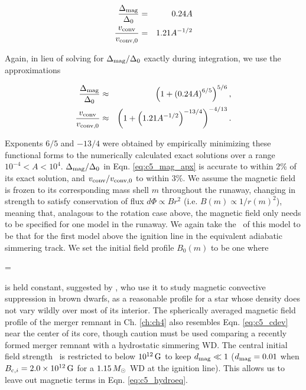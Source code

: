 
\begin{eqnarray}
\frac{\dnabmag}{\dnabconvzero} &=& 0.24A \nonumber \\
\frac{\vconv}{\vconvzero} &=& 1.21A^{-1/2}
\label{eq:c5_mag_exactsoln}
\end{eqnarray}

\noindent Again, in lieu of solving for $\dnabmag/\dnabconvzero$ exactly during integration, we use the approximations 

\begin{eqnarray}
\frac{\dnabmag}{\dnabconvzero} &\approx& \left(1 + \left(0.24A\right)^{6/5}\right)^{5/6}, \nonumber \\
\frac{\vconv}{\vconvzero} &\approx& \left(1 + \left(1.21A^{-1/2}\right)^{-13/4}\right)^{-4/13}.
\label{eq:c5_mag_apx}
\end{eqnarray}

\noindent Exponents $6/5$ and $-13/4$ were obtained by empirically minimizing these functional forms to the numerically calculated exact solutions over a range $10^{-4} < A < 10^4$.  $\dnabmag/\dnabconvzero$ in Eqn. \ref{eq:c5_mag_apx} is accurate to within $2$\% of its exact solution, and $\vconv/\vconvzero$ to within $3$\%.  We assume the magnetic field is frozen to its corresponding mass shell $m$ throughout the runaway, changing in strength to satisfy conservation of flux $d\Phi \propto B r^2$ (i.e. $B(m) \propto 1/r(m)^2$), meaning that, analagous to the rotation case above, the magnetic field only needs to be specified for one model in the runaway.  We again take the \Sc\ of this model to be that for the first model above the ignition line in the equivalent adiabatic simmering track.  We set the initial field profile $B_0(m)$ to be one where

\eqbegin
\dmag = 
\label{eq:c5_cdev}
\eqend


\noindent is held constant, suggested by \cite{macdm09}, who use it to study magnetic convective suppression in brown dwarfs, as a reasonable profile for a star whose density does not vary wildly over most of its interior.  The spherically averaged magnetic field profile of the merger remnant in Ch. \ref{ch:ch4} also resembles Eqn. \ref{eq:c5_cdev} near the center of its core, though caution must be used comparing a recently formed merger remnant with a hydrostatic simmering WD.  The central initial field strength \Binit\ is restricted to below $10^{12}\,\mathrm{G}$ to keep $\dmag \ll 1$ ($\dmag = 0.01$ when $\Binit = 2.0\times10^{12}\,\mrm{G}$ for a $1.15\,\Msun$ WD at the ignition line).  This allows us to leave out magnetic terms in Eqn. \ref{eq:c5_hydroeq}.

